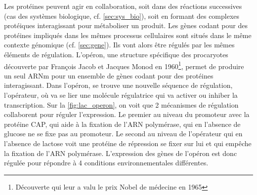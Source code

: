 Les protéines peuvent agir en collaboration, soit dans des réactions successives (cas des systèmes biologique, cf. \autoref{sec:sys_bio}), soit en formant des complexes protéiques interagissant pour métaboliser un produit. Les gènes codant pour des protéines impliqués dans les mêmes processus cellulaires sont situés dans le même contexte génomique (cf. \autoref{sec:gene}). Ils vont alors être régulés par les mêmes éléments de régulation. L'opéron, une structure spécifique des procaryotes découverte par François Jacob et Jacques Monod en 1960\footnote{Découverte qui leur a valu le prix Nobel de médecine en 1965}\cite{jacob_operon_2005}, permet de produire un seul ARNm pour un ensemble de gènes codant pour des protéines interagissant. Dans l'opéron, se trouve une nouvelle séquence de régulation, l'opérateur, où va se lier une molécule régulatrice qui va activer ou inhiber la transcription. Sur la \autoref{fig:lac_operon}, on voit que 2 mécanismes de régulation collaborent pour réguler l'expression. Le premier au niveau du promoteur avec la protéine CAP, qui aide à la fixation de l'ARN polymérase, qui en l'absence de glucose ne se fixe pas au promoteur. Le second au niveau de l'opérateur qui en l'absence de lactose voit une protéine de répression se fixer sur lui et qui empêche la fixation de l'ARN polymérase. L'expression des gènes de l'opéron est donc régulée pour répondre à 4 conditions environnementales différentes.



